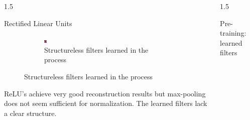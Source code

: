 \documentclass[final]{beamer}
\newlength{\onecolwid}
\newlength{\threecolwid}
\begin{document}
\begin{frame}[t]
\begin{columns}[t]
\begin{column}{\threecolwid}
\begin{columns}[t, totalwidth=\threecolwid]
\begin{column}{1.5\onecolwid}
\begin{block}{Rectified Linear Units}
\begin{figure}
\begin{subfigure}{0.4\linewidth}
			\includegraphics[width=0.1\linewidth]{graphics/reconstructions/cifar/relu/relu_filter_08.png} 

			\caption{Structureless filters learned in the process}

		\end{subfigure}


	\end{figure}

	ReLU's achieve very good reconstruction results but max-pooling does not seem sufficient for normalization. The learned filters lack a clear structure.

\end{block}

\end{column}

\begin{column}{1.5\onecolwid}

	\begin{block}{Pre-training: learned filters}

		\begin{figure}
		\centering


\end{figure}
\end{block}
\end{column}
\end{columns}
\end{column}
\end{columns}
\end{frame}
\end{document}
